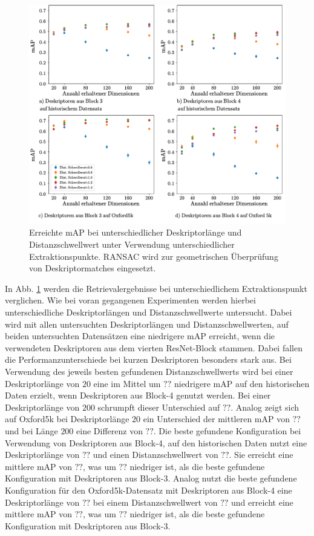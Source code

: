 \\
\begin{figure}
\includegraphics[scale=0.73]{mAP_layer_diff_ransac}
\caption{Erreichte mAP bei unterschiedlicher Deskriptorlänge und Distanzschwellwert unter Verwendung unterschiedlicher Extraktionspunkte.
RANSAC wird zur geometrischen Überprüfung von Deskriptormatches eingesetzt.}
\label{mAP_layer_diff_ransac}
\end{figure}
In Abb. \ref{mAP_layer_diff_ransac} werden die Retrievalergebnisse bei unterschiedlichem Extraktionspunkt verglichen. Wie bei voran gegangenen Experimenten werden hierbei unterschiedliche Deskriptorlängen und Distanzschwellwerte untersucht. Dabei wird mit allen untersuchten Deskriptorlängen und Distanzschwellwerten, auf beiden untersuchten Datensätzen eine niedrigere mAP erreicht, wenn die verwendeten Deskriptoren aus dem vierten ResNet-Block stammen. Dabei fallen die Performanzunterschiede bei kurzen Deskriptoren besonders stark aus. Bei Verwendung des jeweils besten gefundenen Distanzschwellwerts wird bei einer Deskriptorlänge von $20$ eine im Mittel um $??$ niedrigere mAP auf den historischen Daten erzielt, wenn Deskriptoren aus Block-4 genutzt werden. Bei einer Deskriptorlänge von $200$ schrumpft dieser Unterschied auf $??$. Analog zeigt sich auf Oxford5k bei Deskriptorlänge $20$ ein Unterschied der mittleren mAP von $??$ und bei Länge $200$ eine Differenz von $??$. Die beste gefundene Konfiguration bei Verwendung von Deskriptoren aus Block-4, auf den historischen Daten nutzt eine Deskriptorlänge von $??$ und einen Distanzschwellwert von $??$. Sie erreicht eine mittlere mAP von $??$, was um $??$ niedriger ist, als die beste gefundene Konfiguration mit Deskriptoren aus Block-3. Analog nutzt die beste gefundene Konfiguration für den Oxford5k-Datensatz mit Deskriptoren aus Block-4 eine Deskriptorlänge von $??$ bei einem Distanzschwellwert von $??$ und erreicht eine mittlere mAP von $??$, was um $??$ niedriger ist, als die beste gefundene Konfiguration mit Deskriptoren aus Block-3.
